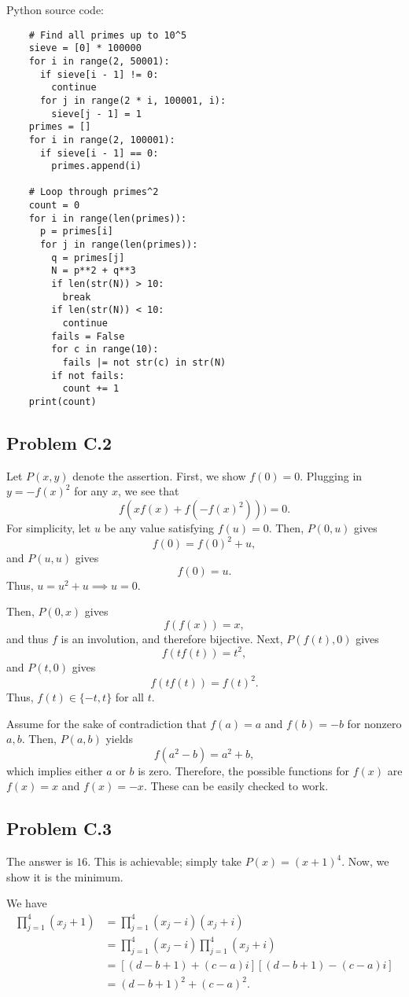 \documentclass{scrartcl}
\begin{document}
Python source code:
\begin{lstlisting}
    # Find all primes up to 10^5
    sieve = [0] * 100000
    for i in range(2, 50001):
      if sieve[i - 1] != 0:
        continue
      for j in range(2 * i, 100001, i):
        sieve[j - 1] = 1
    primes = []
    for i in range(2, 100001):
      if sieve[i - 1] == 0:
        primes.append(i)
    
    # Loop through primes^2
    count = 0
    for i in range(len(primes)):
      p = primes[i]
      for j in range(len(primes)):
        q = primes[j]
        N = p**2 + q**3
        if len(str(N)) > 10:
          break
        if len(str(N)) < 10:
          continue
        fails = False
        for c in range(10):
          fails |= not str(c) in str(N)
        if not fails:
          count += 1
    print(count)
\end{lstlisting}

\subsection*{Problem C.2}
Let $P(x,y)$ denote the assertion.
First, we show $f(0) = 0$.
Plugging in $y = -f(x)^2$ for any $x$, we see that
\[ f(xf(x) + f(-f(x)^2))) = 0. \]
For simplicity, let $u$ be any value satisfying $f(u) = 0$.
Then, $P(0,u)$ gives
\[ f(0) = f(0)^2 + u, \]
and $P(u,u)$ gives
\[ f(0) = u. \]
Thus, $u = u^2 + u \implies u = 0$.

Then, $P(0,x)$ gives
\[ f(f(x)) = x, \]
and thus $f$ is an involution, and therefore bijective.
Next, $P(f(t),0)$ gives
\[ f(tf(t)) = t^2, \]
and $P(t,0)$ gives
\[ f(tf(t)) = f(t)^2. \]
Thus, $f(t) \in \{-t, t\}$ for all $t$.

Assume for the sake of contradiction that $f(a) = a$ and $f(b) = -b$ for nonzero $a,b$.
Then, $P(a,b)$ yields
\[ f(a^2 - b) = a^2 + b, \]
which implies either $a$ or $b$ is zero.
Therefore, the possible functions for $f(x)$ are $f(x) = x$ and $f(x) = -x$.
These can be easily checked to work.

\subsection*{Problem C.3}
The answer is $16$.
This is achievable; simply take $P(x) = (x+1)^4$.
Now, we show it is the minimum.

We have
\begin{align*}
    \prod_{j=1}^4 (x_j + 1) &= \prod_{j=1}^4 (x_j - i)(x_j + i) \\
    &= \prod_{j=1}^4 (x_j - i) \prod_{j=1}^4 (x_j + i) \\
    &= [(d-b+1)+(c-a)i][(d-b+1)-(c-a)i] \\
    &= (d-b+1)^2 + (c-a)^2.
\end{align*}
\end{document}

